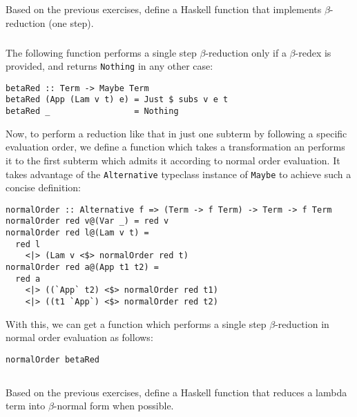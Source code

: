\documentclass{article}
\begin{document}
\subsection{}\label{ex:16}

Based on the previous exercises, define a Haskell function 
that implements $\beta$-reduction (one step).

\subsubsection{}

The following function performs a single step 
$\beta$-reduction only if a $\beta$-redex is 
provided, and returns \verb|Nothing| in any 
other case:

\begin{verbatim}
betaRed :: Term -> Maybe Term
betaRed (App (Lam v t) e) = Just $ subs v e t
betaRed _                 = Nothing
\end{verbatim}

Now, to perform a reduction like that in just 
one subterm by following a specific evaluation order, we 
define a function which takes a transformation an 
performs it to the first subterm which admits it according
to normal order evaluation. It takes advantage of the 
\verb|Alternative| typeclass instance of \verb|Maybe| 
to achieve such a concise definition:

\begin{verbatim}
normalOrder :: Alternative f => (Term -> f Term) -> Term -> f Term
normalOrder red v@(Var _) = red v
normalOrder red l@(Lam v t) =
  red l
    <|> (Lam v <$> normalOrder red t)
normalOrder red a@(App t1 t2) =
  red a
    <|> ((`App` t2) <$> normalOrder red t1)
    <|> ((t1 `App`) <$> normalOrder red t2)
\end{verbatim}

With this, we can get a function which performs a single 
step $\beta$-reduction in normal order evaluation as follows:

\begin{verbatim}
normalOrder betaRed
\end{verbatim}

\subsection{}\label{ex:17}

Based on the previous exercises, define a Haskell function 
that reduces a lambda term into $\beta$-normal form when 
possible.
\end{document}
